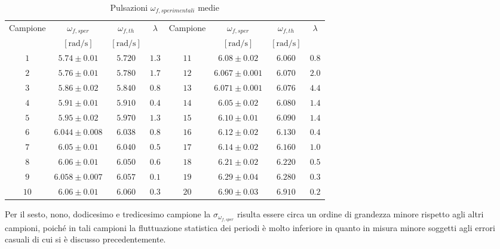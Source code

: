 \documentclass[a4paper,11pt,oneside]{article}
\begin{document}
\begin{table}[h!]
    \centering
    \begin{tabular}{|c|c|c|c||c|c|c|c|}
        \hline
        \multirow{2}{*}{Campione} & $\omega_{f,sper}$ & $\omega_{f,th}$ & \multirow{2}{*}{$\lambda$} & \multirow{2}{*}{Campione} & $\omega_{f,sper}$ & $\omega_{f,th}$ & \multirow{2}{*}{$\lambda$}\\
         & $[\si{\radian\per\second}]$&$[\si{\radian\per\second}]$ &  & & $[\si{\radian\per\second}]$&$[\si{\radian\per\second}]$ &\\
        \hline
        \rowcolor[rgb]{0.85,0.85,0.85}$1$ & $5.74\pm0.01$ & $5.720$ & $1.3$ & $11$ & $6.08\pm0.02$ & $6.060$ & $0.8$\\ \hline
        $2$ & $5.76\pm0.01$ & $5.780$ & $1.7$ & $12$ & $6.067\pm0.001$ & $6.070$ & $2.0$\\ \hline
        \rowcolor[rgb]{0.85,0.85,0.85}$3$ & $5.86\pm0.02$ & $5.840$ & $0.8$ & $13$ & $6.071\pm0.001$ & $6.076$ & $4.4$\\ \hline
        $4$ & $5.91\pm0.01$ & $5.910$ & $0.4$ & $14$ & $6.05\pm0.02$ & $6.080$ & $1.4$\\ \hline
        \rowcolor[rgb]{0.85,0.85,0.85}$5$ & $5.95\pm0.02$ & $5.970$ & $1.3$ & $15$ & $6.10\pm0.01$ & $6.090$ & $1.4$\\ \hline
        $6$ & $6.044\pm0.008$ & $6.038$ & $0.8$ & $16$ & $6.12\pm0.02$ & $6.130$ & $0.4$\\ \hline
        \rowcolor[rgb]{0.85,0.85,0.85}$7$ & $6.05\pm0.01$ & $6.040$ & $0.5$ & $17$ & $6.14\pm0.02$ & $6.160$ & $1.0$\\ \hline
        $8$ & $6.06\pm0.01$ & $6.050$ & $0.6$ & $18$ & $6.21\pm0.02$ & $6.220$ & $0.5$\\ \hline
        \rowcolor[rgb]{0.85,0.85,0.85}$9$ & $6.058\pm0.007$ & $6.057$ & $0.1$ & $19$ & $6.29\pm0.04$ & $6.280$ & $0.3$\\ \hline
        $10$ & $6.06\pm0.01$ & $6.060$ & $0.3$ & $20$ & $6.90\pm0.03$ & $6.910$ & $0.2$\\ \hline
    \end{tabular}
    \caption{Pulsazioni $\omega_{f, sperimentali}$ medie}
    \label{tab:periodi_medi}
\end{table}

Per il sesto, nono, dodicesimo e tredicesimo campione la $\sigma_{\omega_{f, sper}}$ risulta essere circa un ordine di grandezza minore rispetto agli altri campioni, poiché in tali campioni la fluttuazione statistica dei periodi è molto inferiore in quanto in misura minore soggetti agli errori casuali di cui si è discusso precedentemente.
\end{document}
